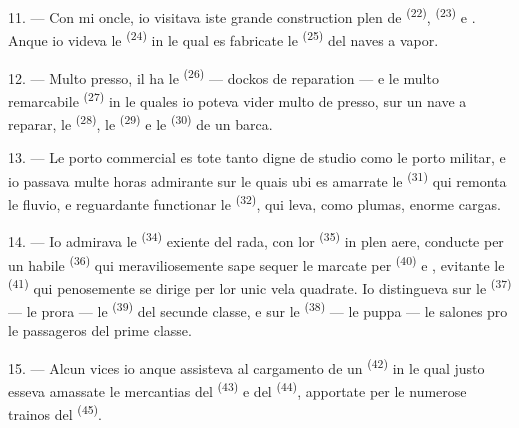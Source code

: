 \VUsaut{3.0mm}
\VUsaut{3.0mm}

11. --- Con mi oncle, io visitava iste grande construction plen de
 \textsuperscript{(22)}, 
\textsuperscript{(23)} e . Anque io videva le  \textsuperscript{(24)} in le qual es fabricate le 
\textsuperscript{(25)} del naves a vapor.

12. --- Multo presso, il ha le  \textsuperscript{(26)} --- dockos
de reparation --- e le multo remarcabile 
\textsuperscript{(27)} in le quales io poteva vider multo de presso, sur un nave
a reparar, le  \textsuperscript{(28)}, le 
\textsuperscript{(29)} e le  \textsuperscript{(30)} de un barca.

13. --- Le porto commercial es tote tanto digne de studio como le porto militar,
e io passava multe horas admirante sur le quais ubi es amarrate le  \textsuperscript{(31)} qui remonta le fluvio, e reguardante functionar
le  \textsuperscript{(32)}, qui leva, como plumas, enorme
cargas.

\VUsaut{4.0mm}
\VUsaut{3.0mm}

14. --- Io admirava le  \textsuperscript{(34)} exiente
del rada, con lor  \textsuperscript{(35)} in plen aere,
conducte per un habile  \textsuperscript{(36)} qui meraviliosemente
sape sequer le  marcate per 
\textsuperscript{(40)} e , evitante le 
\textsuperscript{(41)} qui penosemente se dirige per lor unic vela quadrate. Io
distingueva sur le  \textsuperscript{(37)} --- le prora
--- le  \textsuperscript{(39)} del secunde classe, e sur le
 \textsuperscript{(38)} --- le puppa --- le salones pro
le passageros del prime classe.

15. --- Alcun vices io anque assisteva al cargamento de un 
\textsuperscript{(42)} in le qual justo esseva amassate le mercantias del
 \textsuperscript{(43)} e del 
\textsuperscript{(44)}, apportate per le numerose trainos del  \textsuperscript{(45)}.


